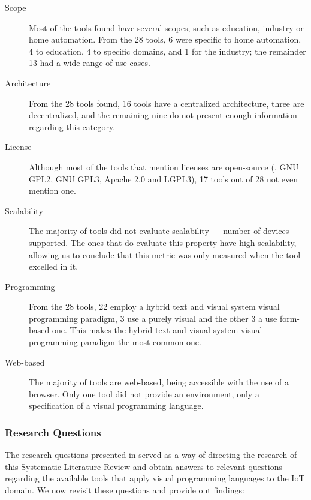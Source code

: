 \begin{description}
    \item [Scope] Most of the tools found have several scopes, such as education, industry or home automation. From the 28 tools, 6 were specific to home automation, 4 to education, 4 to specific domains, and 1 for the industry; the remainder 13 had a wide range of use cases.
    \item [Architecture] From the 28 tools found, 16 tools have a centralized architecture, three are decentralized, and the remaining nine do not present enough information regarding this category.
    \item [License] Although most of the tools that mention licenses are open-source (\eg, GNU GPL2, GNU GPL3, Apache 2.0 and LGPL3), 17 tools out of 28 not even mention one.
    \item [Scalability] The majority of tools did not evaluate scalability --- number of devices supported. The ones that do evaluate this property have high scalability, allowing us to conclude that this metric was only measured when the tool excelled in it.
    \item [Programming] From the 28 tools, 22 employ a hybrid text and visual system visual programming paradigm, 3 use a purely visual and the other 3 a use form-based one. This makes the hybrid text and visual system visual programming paradigm the most common one.
    \item [Web-based] The majority of tools are web-based, being accessible with the use of a browser. Only one tool did not provide an environment, only a specification of a visual programming language.
\end{description}

\subsubsection{Research Questions}\label{sec:answer_slr_research_questions}

The research questions presented in  served as a way of directing the research of this Systematic Literature Review and obtain answers to relevant questions regarding the available tools that apply visual programming languages to the IoT domain. We now revisit these questions and provide out findings:

